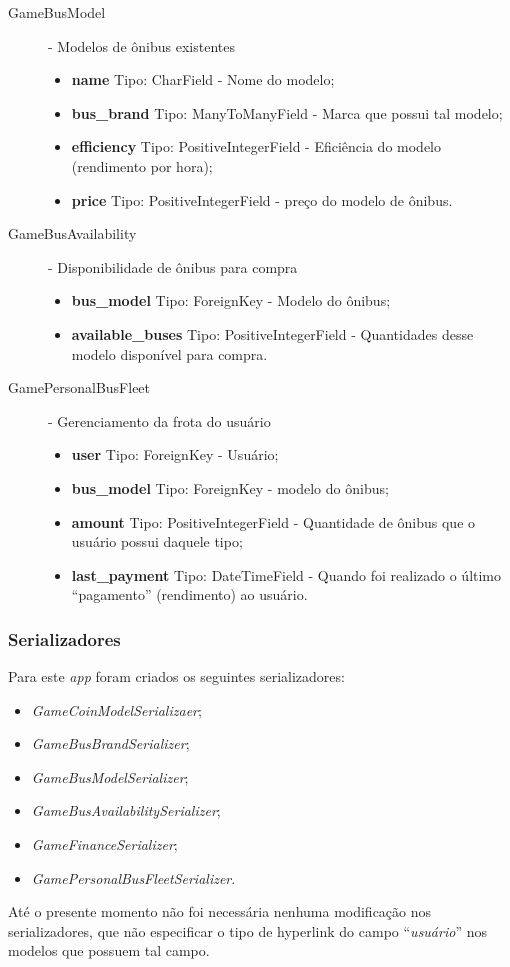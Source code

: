 \begin{description}
\begin{itemize}
        \end{itemize}
    \item[GameBusModel] - Modelos de ônibus existentes
        \begin{itemize}
            \item \textbf{name} Tipo: CharField - Nome do modelo;
            \item \textbf{bus\_brand} Tipo: ManyToManyField - Marca que possui tal modelo;
            \item \textbf{efficiency} Tipo: PositiveIntegerField - Eficiência do modelo (rendimento por hora);
            \item \textbf{price} Tipo: PositiveIntegerField - preço do modelo de ônibus.
        \end{itemize}
    \item[GameBusAvailability] - Disponibilidade de ônibus para compra
        \begin{itemize}
            \item \textbf{bus\_model} Tipo: ForeignKey - Modelo do ônibus;
            \item \textbf{available\_buses} Tipo: PositiveIntegerField - Quantidades desse modelo disponível para compra.
        \end{itemize}
    \item[GamePersonalBusFleet] - Gerenciamento da frota do usuário
        \begin{itemize}
            \item \textbf{user} Tipo: ForeignKey - Usuário;
            \item \textbf{bus\_model} Tipo: ForeignKey - modelo do ônibus;
            \item \textbf{amount} Tipo: PositiveIntegerField - Quantidade de ônibus que o usuário possui daquele tipo;
            \item \textbf{last\_payment} Tipo: DateTimeField - Quando foi realizado o último ``pagamento'' (rendimento) ao usuário.
        \end{itemize}
\end{description}

\subsubsection{Serializadores}
Para este \textit{app} foram criados os seguintes serializadores: %
\begin{itemize}
    \item \textit{GameCoinModelSerializaer};
    \item \textit{GameBusBrandSerializer};
    \item \textit{GameBusModelSerializer};
    \item \textit{GameBusAvailabilitySerializer};
    \item \textit{GameFinanceSerializer};
    \item \textit{GamePersonalBusFleetSerializer}.
\end{itemize}
Até o presente momento não foi necessária nenhuma modificação nos serializadores, que não especificar o tipo de hyperlink do campo ``\textit{usuário}'' nos modelos que possuem tal campo.

